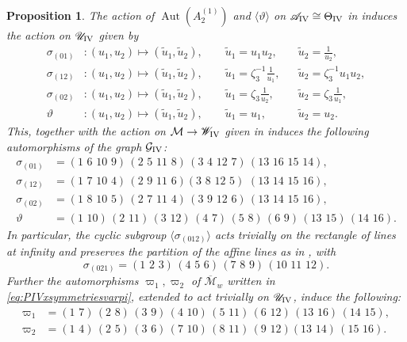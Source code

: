\documentclass[a4paper,reqno]{amsart}
\numberwithin{equation}{section}
\DeclareMathOperator{\Aut}{Aut}
\newtheorem{proposition}[theorem]{Proposition}
\numberwithin{equation}{section}
\begin{document}
\begin{proposition}
    The action of $\Aut(A_2^{(1)})$ and $\langle \vartheta \rangle$ on $\mathscr{A}_{\rm{IV}}\cong\Theta_{\rm{IV}}$ in  induces the action on $\mathscr{U}_{\rm{IV}}$ given by 
        \begin{equation*}
        \begin{aligned}
            \sigma_{(01)} &: (u_1,u_2)\mapsto (\tilde{u}_1,\tilde{u}_2), \qquad \tilde{u}_1 = u_1 u_2, &  
            &\tilde{u}_2 = \frac{1}{u_2}, \\
            \sigma_{(12)} &: (u_1,u_2)\mapsto (\tilde{u}_1,\tilde{u}_2), \qquad \tilde{u}_1 =\zeta_3^{-1} \frac{1}{u_1} , &
            &\tilde{u}_2 = \zeta_3^{-1} u_1 u_2, \\            
            \sigma_{(02)} &: (u_1,u_2)\mapsto (\tilde{u}_1,\tilde{u}_2), \qquad \tilde{u}_1 =\zeta_3 \frac{1}{u_2} , & 
            &\tilde{u}_2 = \zeta_3\frac{1}{u_1}, \\
            \vartheta &: (u_1,u_2) \mapsto (\tilde{u}_1,\tilde{u}_2), \qquad \tilde{u}_1=u_1, & &\tilde{u}_2=u_2.
            \end{aligned}
    \end{equation*} 
    This, together with the action on $\mathcal{M}\to \mathscr{W}_{\rm{IV}}$ given in  
    induces the following automorphisms of the graph $\mathcal{G}_{\rm{IV}}$:
    \begin{align*}
        \sigma_{(01)} &= (1\,\,6\,\,10\,\,9)\,(2\,\,5\,\,11\,\,8)\,(3\,\,4\,\,12\,\,7)\,(13\,\,16\,\,15\,\,14),\\
        \sigma_{(12)} &= (1\,\,7\,\,10\,\,4)\,(2\,\,9\,\,11\,\,6)(3\,\,8\,\,12\,\,5)\,\,(13\,\,14\,\,15\,\,16), \\
        \sigma_{(02)} &= (1\,\,8\,\,10\,\,5)\,(2\,\,7\,\,11\,\,4)\,(3\,\,9\,\,12\,\,6)\,(13\,\,14\,\,15\,\,16),\\
        \vartheta &= (1\,\,10)\,(2\,\,11)\,(3\,\,12)\,(4\,\,7)\,(5\,\,8)\,(6\,\,9)\,(13\,\,15)\,(14\,\,16).
    \end{align*}
In particular, the cyclic subgroup $\langle \sigma_{(012)} \rangle$ acts trivially on the rectangle of lines at infinity and preserves the partition of the affine lines as in , with 
$$\sigma_{(021)}= (1\,\,2\,\,3)\,(4\,\,5\,\,6)\,(7\,\,8\,\,9)\,(10\,\,11\,\,12).$$
Further the automorphisms $\varpi_1,\varpi_2$ of $\overline{\mathcal{M}}_w$ written in \eqref{eq:PIVxsymmetriesvarpi}, extended to act trivially on $\mathscr{U}_{\rm{IV}}$, induce the following:
\begin{align*}
    \varpi_1 &= (1\,\,7)\,(2\,\,8)\,(3\,\,9)\,(4\,\,10)\,(5\,\,11)\,(6\,\,12)\,(13\,\,16)\,(14\,\,15),\\
    \varpi_2 &= (1\,\,4)\,(2\,\,5)\,(3\,\,6)\,(7\,\,10)\,(8\,\,11)\,(9\,\,12)(13\,\,14)\,(15\,\,16).
\end{align*}
\end{proposition}
\end{document}
